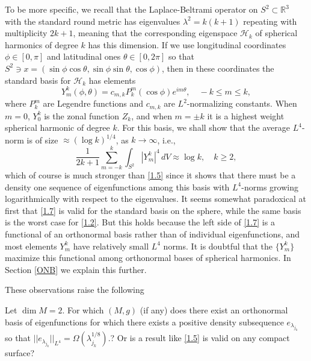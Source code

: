 \documentclass[10pt]{amsart}
\begin{document}
To be more specific, we recall that the Laplace-Beltrami operator on
$S^2\subset {\mathbb R}^3$ with the standard round metric
has eigenvalues $\lambda^2=k(k+1)$ repeating with multiplicity
$2k+1$, meaning that the corresponding eigenspace ${\mathcal H}_k$
of spherical harmonics of degree $k$ has this dimension.  If we use
longitudinal coordinates $\phi \in [0,\pi]$ and latitudinal ones
$\theta\in [0,2\pi]$ so that $S^2\ni x=(\sin \phi \cos\theta, \sin\phi \sin\theta, \cos\phi)$,
then in these coordinates the standard basis for ${\mathcal H}_k$ has
elements
\begin{equation}\label{1.6}
Y^k_m(\phi,\theta)=c_{m,k}P^m_k(\cos\phi)e^{im\theta}, \quad -k\le
m\le k,
\end{equation}
where $P^m_k$ are Legendre functions and $c_{m,k}$ are
$L^2$-normalizing constants.  When $m=0$, $Y^k_0$ is the zonal
function $Z_k$, and when $m=\pm k$ it is a highest weight
spherical harmonic of degree $k$.  For this basis, we shall show
that the average $L^4$-norm is of size $\approx (\log k)^{1/4}$,
as $k\to \infty$,  i.e.,
\begin{equation}\label{1.7}
\frac1{2k+1}\sum_{m=-k}^k\int_{S^2}|Y^k_m|^4\, dV \approx \log k,
\quad k\ge2,
\end{equation}
which of course is much stronger than \eqref{1.5} since it shows
that there must be a density one sequence of eigenfunctions among
this basis with $L^4$-norms growing logarithmically with respect
to the eigenvalues.  It seems somewhat paradoxical at first  that
\eqref{1.7} is valid for the standard basis on the sphere, while
the same basis  is the worst case for \eqref{1.2}. But this holds
because  the left side of \eqref{1.7} is a functional of  an
orthonormal basis rather than of individual eigenfunctions, and
most elements $Y^k_m$ have relatively small $L^4$ norms. It is
doubtful that the $\{Y^k_m\}$ maximize this functional among
orthonormal bases of spherical harmonics. In Section \ref{ONB} we
explain this further.

These observations raise the following \medskip

  Let $\dim M = 2$. For which $(M, g)$ (if
any) does there exist an orthonormal basis of eigenfunctions for
which there exists a positive density subsequence $e_{{\lambda}_{j_k}}$ so
that $||e_{{\lambda}_{j_k}}||_{L^4} = \Omega (\lambda_{j_k}^{1/8}).$? Or
is a result like \eqref{1.5} is  valid on any compact surface?
\medskip
\end{document}
